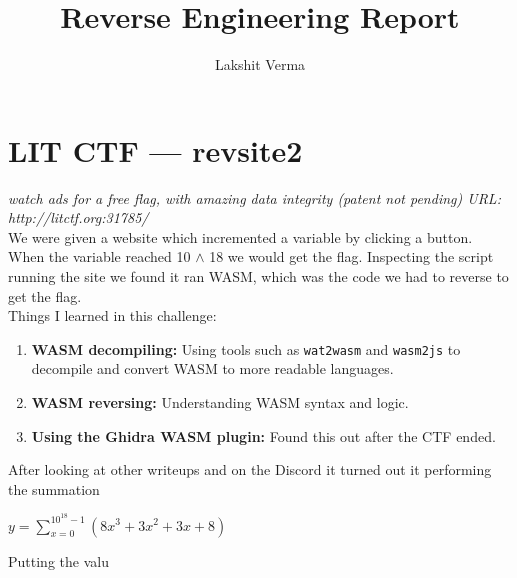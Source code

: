 \documentclass{article}
\title{Reverse Engineering Report}
\author{Lakshit Verma}
\begin{document}
\maketitle

\section*{LIT CTF — revsite2}

\textit{watch ads for a free flag, with amazing data integrity (patent not pending) URL: http://litctf.org:31785/} \\

We were given a website which incremented a variable by clicking a button. When the variable reached 10 $\wedge$ 18 we would get the flag. Inspecting the script running the site we found it ran WASM, which was the code we had to reverse to get the flag. \\

Things I learned in this challenge:

\begin{enumerate}
    \item{\textbf{WASM decompiling:} Using tools such as \texttt{wat2wasm} and \texttt{wasm2js} to decompile and convert WASM to more readable languages.}
    \item{\textbf{WASM reversing:} Understanding WASM syntax and logic.}
    \item{\textbf{Using the Ghidra WASM plugin:} Found this out after the CTF ended.}
\end{enumerate}

After looking at other writeups and on the Discord it turned out it performing the summation

\begin{center}
    $y = \displaystyle\sum_{x=0}^{10^{18}-1} (8x^3 + 3x^2 + 3x + 8)$
\end{center}

Putting the valu
\end{document}
